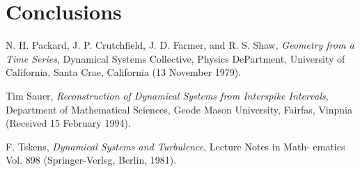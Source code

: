 \documentclass[10pt]{article}
\begin{document}
\section{Conclusions}

\begin{thebibliography}{99}
 
N. H. Packard, J. P. Crutchfield, J. D. Farmer, and R. S. Shaw, {\it Geometry from a Time Series}, Dynamical Systems Collective, Physics DePartment, University of California, Santa Crae, California (13 November 1979).

Tim Sauer, {\it Reconstruction of Dynamical Systems from Interspike Intervals}, Department of Mathematical Sciences, Geode Mason University, Fairfas, Vinpnia (Received 15 February 1994).

F. Tskens, {\it Dynamical Systems and Turbulence}, Lecture Notes in Math-
ematics Vol. 898 (Springer-Verlsg, Berlin, 1981).

\end{thebibliography}
\end{document}

